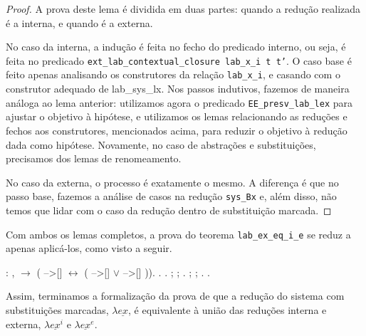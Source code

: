 \begin{addmargin}[1em]{2em}
\begin{proof}
A prova deste lema é dividida em duas partes: quando a redução realizada é a
interna, e quando é a externa. 

No caso da interna, a indução é feita no fecho do predicado interno, ou seja, é
feita no predicado \texttt{ext\_lab\_contextual\_closure lab\_x\_i t t'}. O caso
base é feito apenas analisando os construtores da relação \texttt{lab\_x\_i}, e
casando com o construtor adequado de lab\_sys\_lx. Nos passos indutivos, fazemos
de maneira análoga ao lema anterior: utilizamos agora o predicado
\texttt{EE\_presv\_lab\_lex} para ajustar o objetivo à hipótese, e utilizamos os
lemas relacionando as reduções e fechos aos construtores, mencionados acima,
para reduzir o objetivo à redução dada como hipótese. Novamente, no caso de
abstrações e substituições, precisamos dos lemas de renomeamento.

No caso da externa, o processo é exatamente o mesmo. A diferença é que no passo
base, fazemos a análise de casos na redução \texttt{sys\_Bx} e, além disso, não
temos que lidar com o caso da redução dentro de substituição marcada.
\end{proof}

\end{addmargin}

\bigskip

Com ambos os lemas completos, a prova do teorema \texttt{lab\_ex\_eq\_i\_e} se
reduz a apenas aplicá-los, como visto a seguir. 

\bigskip {} :
\coqdockw{\ensuremath{\forall}}  ,
  \ensuremath{\rightarrow} (
-->[]  \ensuremath{\leftrightarrow} (
-->[]  \ensuremath{\lor} 
-->[] )).\coqdoceol \coqdocnoindent
{}.\coqdoceol \coqdocindent{2.00em} .\coqdoceol
\coqdocindent{2.00em} ; 
; .\coqdoceol
\coqdocindent{2.00em} ; 
; .\coqdoceol \coqdocnoindent
{}.\coqdoceol \bigskip

Assim, terminamos a formalização da prova de que a redução do sistema com
substituições marcadas, $\lambda \underline{ex}$, é equivalente à união das reduções
interna e externa, $\lambda \underline{ex}^i$ e $\lambda \underline{ex}^e$.
